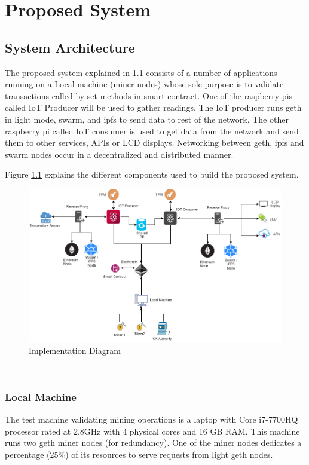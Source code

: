 \documentclass[11pt,openright]{report}
\begin{document}
\chapter{Proposed System} \label{chapter:proposed_system}
\section{System Architecture} \label{ss:construct_architecture}
The proposed system explained in \ref{fig:impldiagram_architechture} consists of a number of applications running on a Local machine (miner nodes) whose sole purpose is to validate transactions called by set methods in smart contract. One of the raspberry pis called IoT Producer will be used to gather readings. The IoT producer runs geth in light mode, swarm, and ipfs to send data to rest of the network. The other raspberry pi called IoT consumer is used to get data from the network and send them to other services, APIs or LCD displays. Networking between geth, ipfs and swarm nodes occur in a decentralized and distributed manner.

Figure \ref{fig:impldiagram_architechture} explains the different components used to build the proposed system.
\newline
\newline
\begin{figure}
	\centering
	\includegraphics[scale=0.5]{images/Final_Implementationv2.png}
	\caption{Implementation Diagram}
	\label{fig:impldiagram_architechture}
\end{figure}
\newpage
\hfill\\
\subsection{Local Machine}
The test machine validating mining operations is a laptop with Core i7-7700HQ processor rated at 2.8GHz with 4 physical cores and 16 GB RAM. This machine runs two geth miner nodes (for redundancy). One of the miner nodes dedicates a percentage (25\%) of its resources to serve requests from light geth nodes.
\end{document}
